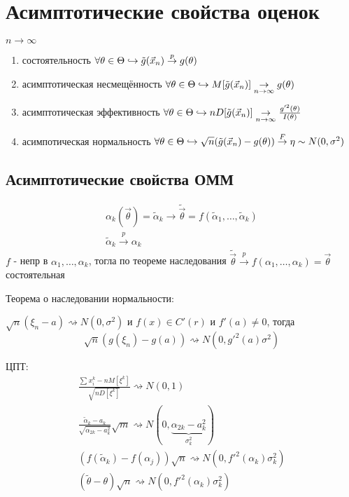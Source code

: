 \documentclass{article}
\begin{document}
\section{Асимптотические свойства оценок}
$n\to\infty$
\begin{enumerate}
  \item состоятельность $\forall \theta \in \Theta \hookrightarrow \tilde{g}(\vec{x}_n)\overset{p}{\to}g(\theta)$
  \item асимптотическая несмещённость $\forall \theta \in \Theta \hookrightarrow M[\tilde{g}(\vec{x}_n)] \underset{n\to \infty}{\to}g(\theta)$
  \item асимптотическая эффективность $\forall \theta\in\Theta\hookrightarrow nD[\tilde{g}(\vec{x}_n)] \underset{n\to\infty}{\to}\frac{g'^{2}(\theta)}{I(\theta)}$
  \item асимпотическая нормальность $\forall \theta \in \Theta \hookrightarrow \sqrt{n}(\tilde{g}(\vec{x}_n)-g(\theta)) \overset{F}{\to} \eta\sim N(0,\sigma^{2})$
\end{enumerate}

\subsection{Асимптотические свойства ОММ}
\begin{gather*}
  \alpha_k(\vec{\theta})=\tilde{\alpha}_k \to \tilde{\vec{\theta}}=f(\tilde{\alpha}_1,\dots ,\tilde{\alpha}_k) \\ 
  \tilde{\alpha}_k \overset{p}{\to}\alpha_k
\end{gather*}
$f$ - непр в $\alpha_1,\dots ,\alpha_k$, тогла по теореме наследования 
$\tilde{\vec{\theta}}\overset{p}{\to}f(\alpha_1,\dots ,\alpha_k)=\vec{\theta}$ состоятельная

Теорема о наследовании нормальности:

$\sqrt{n}(\xi_n-a) \rightsquigarrow N(0,\sigma^{2})$ и $f(x)\in C'(r)$ и $f'(a)\neq 0$,
тогда
\[
  \sqrt{n}(g(\xi_n)-g(a)) \rightsquigarrow N(0,g'^{2}(a)\sigma^{2})
\]

ЦПТ:
\begin{gather*}
  \frac{\sum_{}^{}x_i^{k}-nM[\xi^{k}]}{\sqrt{nD[\xi^{k}]}} \rightsquigarrow N(0,1) \\ 
  \frac{\tilde{\alpha}_k-a_k}{\sqrt{\alpha_{2k}-a_k^{2}}}\sqrt{m}\rightsquigarrow N(0, \underbrace{\alpha_{2k}-a_k^{2}}_{\sigma_k^{2}}) \\ 
  (f(\tilde{\alpha}_k)-f(\alpha_j))\sqrt{n} \rightsquigarrow N(0,f'^{2}(\alpha_k)\sigma_k^{2}) \\ 
  (\tilde{\theta}-\theta)\sqrt{n} \rightsquigarrow N(0,f'^{2}(\alpha_k)\sigma_k^{2})
\end{gather*}
\end{document}
